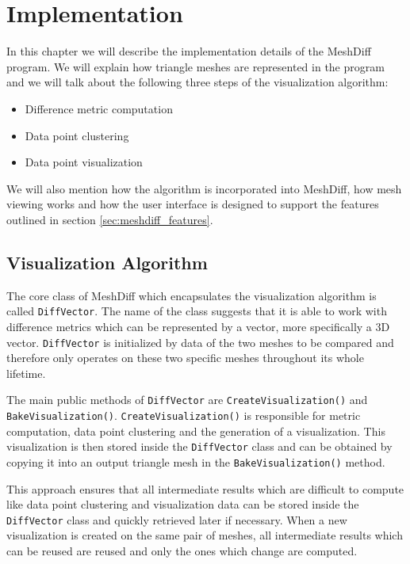 \chapter{Implementation}

In this chapter we will describe the implementation details of the MeshDiff program. We will explain how triangle meshes are represented in the program and we will talk about the following three steps of the visualization algorithm:

\begin{itemize}
\item Difference metric computation
\item Data point clustering
\item Data point visualization
\end{itemize}

We will also mention how the algorithm is incorporated into MeshDiff, how mesh viewing works and how the user interface is designed to support the features outlined in section \ref{sec:meshdiff_features}.

\section{Visualization Algorithm}

The core class of MeshDiff which encapsulates the visualization algorithm is called \verb+DiffVector+. The name of the class suggests that it is able to work with difference metrics which can be represented by a vector, more specifically a 3D vector. \verb+DiffVector+ is initialized by data of the two meshes to be compared and therefore only operates on these two specific meshes throughout its whole lifetime.

The main public methods of \verb+DiffVector+ are \verb+CreateVisualization()+ and \verb+BakeVisualization()+. \verb+CreateVisualization()+ is responsible for metric computation, data point clustering and the generation of a visualization. This visualization is then stored inside the \verb+DiffVector+ class and can be obtained by copying it into an output triangle mesh in the \verb+BakeVisualization()+ method.

This approach ensures that all intermediate results which are difficult to compute like data point clustering and visualization data can be stored inside the \verb+DiffVector+ class and quickly retrieved later if necessary. When a new visualization is created on the same pair of meshes, all intermediate results which can be reused are reused and only the ones which change are computed.

